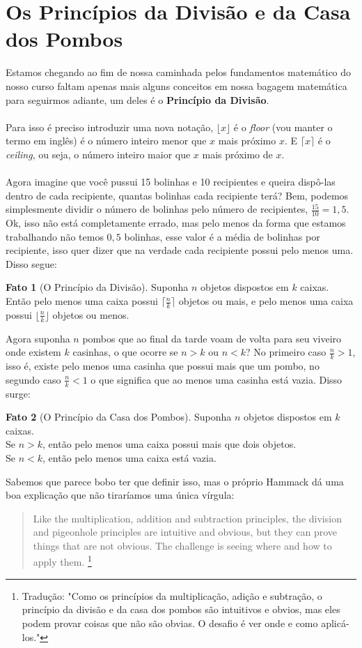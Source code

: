 \documentclass[a4paper,11pt,oneside]{book}
\theoremstyle{definition}
\theoremstyle{break}
\newtheorem{fact}{Fato}[section]
\begin{document}
\section{Os Princípios da Divisão e da Casa dos Pombos}

Estamos chegando ao fim de nossa caminhada pelos fundamentos matemático do nosso curso faltam apenas mais alguns conceitos em nossa bagagem matemática para seguirmos adiante, um deles é o \textbf{Princípio da Divisão}.
\\
\\
Para isso é preciso introduzir uma nova notação, $\lfloor x \rfloor$ é o \textit{floor} (vou manter o termo em inglês) é o número inteiro menor que $x$ mais próximo $x$. E $\lceil x \rceil$ é o \textit{ceiling}, ou seja, o número inteiro maior que $x$ mais próximo de $x$.
\\
\\
Agora imagine que você pussui 15 bolinhas e 10 recipientes e queira dispô-las dentro de cada recipiente, quantas bolinhas cada recipiente terá? Bem, podemos simplesmente dividir o número de bolinhas pelo número de recipientes, $\frac{15}{10} = 1,5$. Ok, isso não está completamente errado, mas pelo menos da forma que estamos trabalhando não temos $0,5$ bolinhas, esse valor é a média de bolinhas por recipiente, isso quer dizer que na verdade cada recipiente possui pelo menos uma. Disso segue: 
\begin{fact}[O Princípio da Divisão]
Suponha $n$ objetos dispostos em $k$ caixas. \\
Então pelo menos uma caixa possui $\lceil \frac{n}{k} \rceil$ objetos ou mais, e
pelo menos uma caixa possui $\lfloor \frac{n}{k} \rfloor$ objetos ou menos.
\end{fact}
Agora suponha $n$ pombos que ao final da tarde voam de volta para seu viveiro onde existem $k$ casinhas, o que ocorre se $n > k$ ou $n < k$?
No primeiro caso $\frac{n}{k} > 1$, isso é, existe pelo menos uma casinha que possui mais que um pombo, no segundo caso $\frac{n}{k} < 1$ o que significa que ao menos uma casinha está vazia. Disso surge:
\begin{fact}[O Princípio da Casa dos Pombos]
Suponha $n$ objetos dispostos em $k$ caixas.\\
Se $n > k$, então pelo menos uma caixa possui mais que dois objetos.\\
Se $n < k$, então pelo menos uma caixa está vazia.
\end{fact}
Sabemos que parece bobo ter que definir isso, mas o próprio Hammack dá uma boa explicação que não tiraríamos uma única vírgula:
\begin{quote}
Like the multiplication, addition and subtraction principles, the division
and pigeonhole principles are intuitive and obvious, but they can prove
things that are not obvious. The challenge is seeing where and how to apply
them. \footnote{Tradução: "Como os princípios da multiplicação, adição e subtração, o princípio da divisão e da casa dos pombos são intuitivos e obvios, mas eles podem provar coisas que não são obvias. O desafio é ver onde e como aplicá-los."}
\end{quote}
\end{document}
